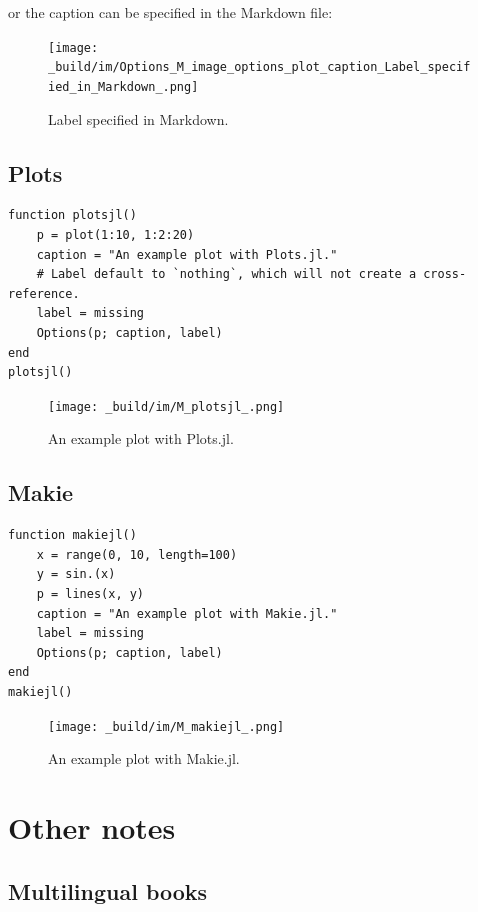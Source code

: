 \documentclass[
  14pt
  american,
  paper=a4,
  ,captions=tableheading
]{scrreprt}
\begin{document}
or the caption can be specified in the Markdown file:

\begin{figure}
\centering
\texttt{[image: \_build/im/Options\_M\_image\_options\_plot\_caption\_Label\_specified\_in\_Markdown\_.png]}
\caption{Label specified in Markdown.}
\end{figure}

\hypertarget{sec:plotsjl}{%
\subsection{Plots}\label{sec:plotsjl}}

\begin{lstlisting}
function plotsjl()
    p = plot(1:10, 1:2:20)
    caption = "An example plot with Plots.jl."
    # Label default to `nothing`, which will not create a cross-reference.
    label = missing
    Options(p; caption, label)
end
plotsjl()
\end{lstlisting}

\begin{figure}
\centering
\texttt{[image: \_build/im/M\_plotsjl\_.png]}
\caption{An example plot with Plots.jl.}
\end{figure}

\hypertarget{sec:makie}{%
\subsection{Makie}\label{sec:makie}}

\begin{lstlisting}
function makiejl()
    x = range(0, 10, length=100)
    y = sin.(x)
    p = lines(x, y)
    caption = "An example plot with Makie.jl."
    label = missing
    Options(p; caption, label)
end
makiejl()
\end{lstlisting}

\begin{figure}
\centering
\texttt{[image: \_build/im/M\_makiejl\_.png]}
\caption{An example plot with Makie.jl.}
\end{figure}

\hypertarget{other-notes}{%
\section{Other notes}\label{other-notes}}

\hypertarget{multilingual-books}{%
\subsection{Multilingual books}\label{multilingual-books}}
\end{document}
